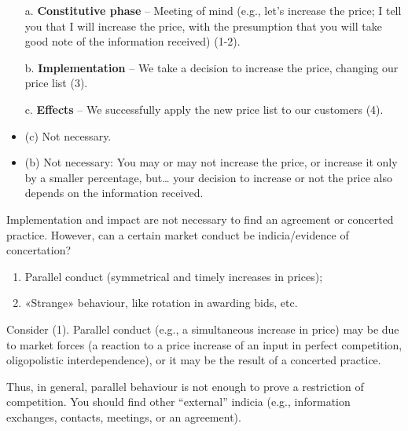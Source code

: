            \begin{enumerate}
                \item[a.] \textbf{Constitutive phase} – Meeting of mind (e.g., let’s increase the price; I tell you that I will increase the price, with the presumption that you will take good note of the information received) (1-2).
                \item[b.] \textbf{Implementation} – We take a decision to increase the price, changing our price list (3).
                \item[c.] \textbf{Effects} – We successfully apply the new price list to our customers (4).
            \end{enumerate}
            
            \begin{itemize}
                \item (c) Not necessary.
                \item (b) Not necessary: You may or may not increase the price, or increase it only by a smaller percentage, but… your decision to increase or not the price also depends on the information received.
            \end{itemize}


            \noindent Implementation and impact are not necessary to find an agreement or concerted practice. However, can a certain market conduct be indicia/evidence of concertation?

            \begin{enumerate}
                \item Parallel conduct (symmetrical and timely increases in prices);
                \item «Strange» behaviour, like rotation in awarding bids, etc.
            \end{enumerate}
            
            \noindent Consider (1). Parallel conduct (e.g., a simultaneous increase in price) may be due to market forces (a reaction to a price increase of an input in perfect competition, oligopolistic interdependence), or it may be the result of a concerted practice.
            
            Thus, in general, parallel behaviour is not enough to prove a restriction of competition. You should find other “external” indicia (e.g., information exchanges, contacts, meetings, or an agreement).
            
